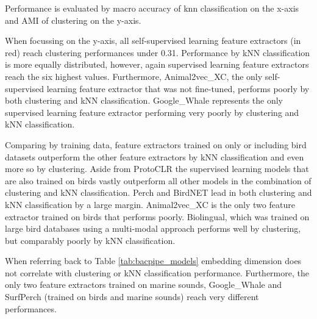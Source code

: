 
    
Performance is evaluated by macro accuracy of knn classification on the x-axis and AMI of clustering on the y-axis.

When focussing on the y-axis, all self-supervised learning feature extractors (in red) reach clustering performances under 0.31.
Performance by kNN classification is more equally distributed, however, again supervised learning feature extractors reach the six highest values.
Furthermore, Animal2vec\_XC, the only self-supervised learning feature extractor that was not fine-tuned, performs poorly by both clustering and kNN classification.
Google\_Whale represents the only supervised learning feature extractor performing very poorly by clustering and kNN classification.

Comparing by training data, feature extractors trained on only or including bird datasets outperform the other feature extractors by kNN classification and even more so by clustering.
Aside from ProtoCLR the supervised learning models that are also trained on birds vastly outperform all other models in the combination of clustering and kNN classification.
Perch and BirdNET lead in both clustering and kNN classification by a large margin.
Animal2vec\_XC is the only two feature extractor trained on birds that performs poorly.
Biolingual, which was trained on large bird databases using a multi-modal approach performs well by clustering, but comparably poorly by kNN classification.

When referring back to Table \ref{tab:bacpipe_models} embedding dimension does not correlate with clustering or kNN classification performance.
Furthermore, the only two feature extractors trained on marine sounds, Google\_Whale and SurfPerch (trained on birds and marine sounds) reach very different performances.
    
